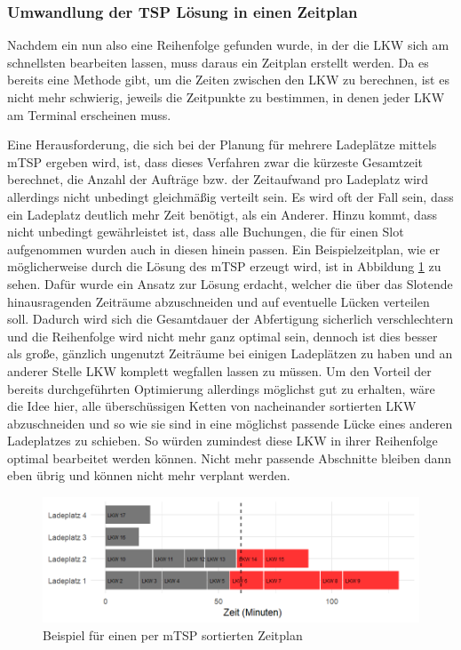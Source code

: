 \subsubsection{Umwandlung der TSP Lösung in einen Zeitplan}
\label{sec:tspToSchedule}

Nachdem ein nun also eine Reihenfolge gefunden wurde, in der die LKW sich am schnellsten bearbeiten lassen, muss daraus ein Zeitplan erstellt werden. Da es bereits eine Methode gibt, um die Zeiten zwischen den LKW zu berechnen, ist es nicht mehr schwierig, jeweils die Zeitpunkte zu bestimmen, in denen jeder LKW am Terminal erscheinen muss.

Eine Herausforderung, die sich bei der Planung für mehrere Ladeplätze mittels mTSP ergeben wird, ist, dass dieses Verfahren zwar die kürzeste Gesamtzeit berechnet, die Anzahl der Aufträge bzw. der Zeitaufwand pro Ladeplatz wird allerdings nicht unbedingt gleichmäßig verteilt sein. Es wird oft der Fall sein, dass ein Ladeplatz deutlich mehr Zeit benötigt, als ein Anderer. Hinzu kommt, dass nicht unbedingt gewährleistet ist, dass alle Buchungen, die für einen Slot aufgenommen wurden auch in diesen hinein passen. Ein Beispielzeitplan, wie er möglicherweise durch die Lösung des mTSP erzeugt wird, ist in Abbildung \ref{fig:tspCutExample1} zu sehen. Dafür wurde ein Ansatz zur Lösung erdacht, welcher die über das Slotende hinausragenden Zeiträume abzuschneiden und auf eventuelle Lücken verteilen soll. Dadurch wird sich die Gesamtdauer der Abfertigung sicherlich verschlechtern und die Reihenfolge wird nicht mehr ganz optimal sein, dennoch ist dies besser als große, gänzlich ungenutzt Zeiträume bei einigen Ladeplätzen zu haben und an anderer Stelle LKW komplett wegfallen lassen zu müssen. Um den Vorteil der bereits durchgeführten Optimierung allerdings möglichst gut zu erhalten, wäre die Idee hier, alle überschüssigen Ketten von nacheinander sortierten LKW abzuschneiden und so wie sie sind in eine möglichst passende Lücke eines anderen Ladeplatzes zu schieben. So würden zumindest diese LKW in ihrer Reihenfolge optimal bearbeitet werden können. Nicht mehr passende Abschnitte bleiben dann eben übrig und können nicht mehr verplant werden.


\begin{figure}[H]
    \centering
    \includegraphics[width=\textwidth]{images/timelines/timelineTspCutExample1.png}
    \caption{Beispiel für einen per mTSP sortierten Zeitplan}
    \label{fig:tspCutExample1}
\end{figure}

